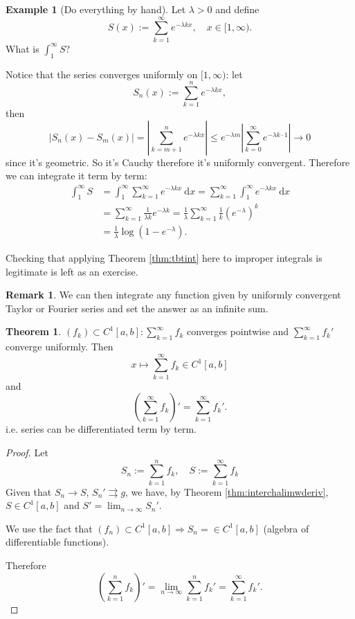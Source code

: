 \documentclass[a4paper]{article}
\theoremstyle{definition}
\newtheorem{thm}[defn]{Theorem}
\newtheorem{example}[defn]{Example}
\newtheorem*{remark}{Remark}
\begin{document}
\begin{example}[Do everything by hand]
Let $\lambda >0$ and define
\[
S(x):=\sum_{k=1}^\infty e^{-\lambda kx},\quad x\in [1,\infty) .
\]
What is $\int_1^\infty S$?

Notice that the series converges uniformly on $[1,\infty)$: let
\[
S_n(x):=\sum_{k=1}^n e^{-\lambda k x},
\]
then
\[
|S_n(x)-S_m(x)|=\left|\sum_{k=m+1}^n e^{-\lambda k x}\right| \leq e^{-\lambda m} \left|\sum_{k=0}^\infty e^{-\lambda k \cdot 1} \right| \rightarrow 0
\]
since it's geometric. So it's Cauchy therefore it's uniformly convergent. Therefore we can integrate it term by term:
\[
\begin{aligned}
\int_1^\infty S &= \int_1^\infty \sum_{k=1}^\infty e^{-\lambda k x} \ \mathrm d x = \sum_{k=1}^\infty \int_1^\infty e^{-\lambda k x} \ \mathrm d x \\&= \sum_{k=1}^\infty \frac{1}{\lambda k} e^{-\lambda k} = \frac{1}{\lambda} \sum_{k=1}^\infty \frac{1}{k}\left(e^{-\lambda}\right)^k \\&= \frac{1}{\lambda} \log \left(1-e^{-\lambda} \right).
\end{aligned}
\]
\end{example}
Checking that applying Theorem \ref{thm:tbtint} here to improper integrals is legitimate is left as an exercise.

\begin{remark}
We can then integrate any function given by uniformly convergent Taylor or Fourier series and set the answer as an infinite sum.
\end{remark}

\begin{thm}
\label{thm:tbtdiff}
$\displaystyle (f_k) \subset C^1 [a,b] : \sum_{k=1}^\infty f_k$ converges pointwise and $\displaystyle \sum_{k=1}^\infty f_k'$ converge uniformly. Then
\[
x\mapsto \sum_{k=1}^\infty f_k \in C^1[a,b]
\]
and
\[
\left(\sum_{k=1}^\infty f_k\right)' = \sum_{k=1}^\infty f_k' .
\]
i.e. series can be differentiated term by term.
\end{thm}
\begin{proof}
Let
\[
S_n := \sum_{k=1}^n f_k ,\quad S := \sum_{k=1}^\infty f_k
\]
Given that $S_n \rightarrow S$, $S_n' \rightrightarrows g$, we have, by Theorem \ref{thm:interchalimwderiv}, $S\in C^1[a,b]$ and $\displaystyle S'=\lim_{n\rightarrow \infty} S_n'$.

We use the fact that $(f_n) \subset C^1[a,b] \Rightarrow S_n= \in C^1[a,b]$ (algebra of differentiable functions).

Therefore
\[
\left(\sum_{k=1}^n f_k \right)' = \lim_{n\rightarrow \infty} \sum_{k=1}^n f_k' = \sum_{k=1}^\infty f_k' .
\]
\end{proof}
\end{document}
